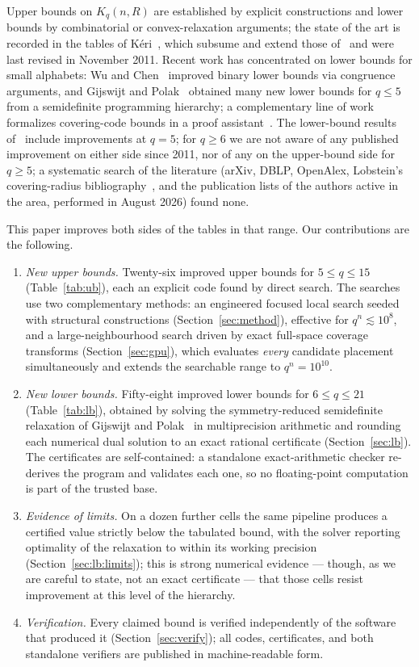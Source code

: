 \documentclass[11pt]{amsart}
\begin{document}
Upper bounds on $K_q(n,R)$ are established by explicit constructions and
lower bounds by combinatorial or convex-relaxation arguments; the state of
the art is recorded in the tables of K\'eri~\cite{Keri}, which subsume and
extend those of~\cite{CHLL} and were last revised in November 2011. Recent
work has concentrated on lower bounds for small alphabets: Wu and
Chen~\cite{WuChen} improved binary lower bounds via congruence arguments,
and Gijswijt and Polak~\cite{GijswijtPolak} obtained many new lower bounds
for $q\le 5$ from a semidefinite programming hierarchy; a complementary
line of work formalizes covering-code bounds in a proof
assistant~\cite{Florath}. The lower-bound results of~\cite{GijswijtPolak}
include improvements at $q=5$; for $q\ge 6$ we are not aware of any
published improvement on either side since 2011, nor of any on the
upper-bound side for $q\ge 5$; a
systematic search of the literature (arXiv, DBLP, OpenAlex, Lobstein's
covering-radius bibliography~\cite{Lobstein}, and the publication lists of
the authors active in the area, performed in August 2026) found none.

This paper improves both sides of the tables in that range. Our
contributions are the following.
\begin{enumerate}
\item \emph{New upper bounds.} Twenty-six improved upper bounds for
$5\le q\le 15$ (Table~\ref{tab:ub}), each an explicit code found by
direct search. The searches use two complementary methods: an engineered
focused local search seeded with structural constructions
(Section~\ref{sec:method}), effective for $q^n\lesssim 10^8$, and a
large-neighbourhood search driven by exact full-space coverage transforms
(Section~\ref{sec:gpu}), which evaluates \emph{every} candidate placement
simultaneously and extends the searchable range to $q^n=10^{10}$.
\item \emph{New lower bounds.} Fifty-eight improved lower bounds for
$6\le q\le 21$ (Table~\ref{tab:lb}), obtained by solving the
symmetry-reduced semidefinite relaxation of Gijswijt and
Polak~\cite{GijswijtPolak} in multiprecision arithmetic and rounding each
numerical dual solution to an exact rational certificate
(Section~\ref{sec:lb}). The certificates are self-contained: a standalone
exact-arithmetic checker re-derives the program and validates each one, so
no floating-point computation is part of the trusted base.
\item \emph{Evidence of limits.} On a dozen further cells the same
pipeline produces a certified value strictly below the tabulated bound,
with the solver reporting optimality of the relaxation to within its
working precision (Section~\ref{sec:lb:limits}); this is strong numerical
evidence --- though, as we are careful to state, not an exact
certificate --- that those cells resist improvement at this level of the
hierarchy.
\item \emph{Verification.} Every claimed bound is verified independently of
the software that produced it (Section~\ref{sec:verify}); all codes,
certificates, and both standalone verifiers are published in
machine-readable form.
\end{enumerate}
\end{document}
